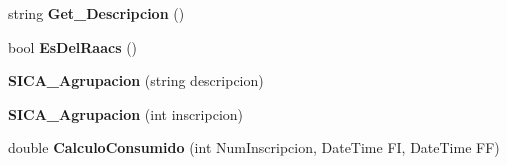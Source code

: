 \begin{DoxyCompactItemize}
\item 
string {\bfseries Get\+\_\+\+Descripcion} ()\hypertarget{class_sica_segura_1_1_s_i_c_a___agrupacion_a41b801855beb2a7ff465c12237178a0e}{}\label{class_sica_segura_1_1_s_i_c_a___agrupacion_a41b801855beb2a7ff465c12237178a0e}

\item 
bool {\bfseries Es\+Del\+Raacs} ()\hypertarget{class_sica_segura_1_1_s_i_c_a___agrupacion_a6d128a60e0dbd6fed779692affa45b9d}{}\label{class_sica_segura_1_1_s_i_c_a___agrupacion_a6d128a60e0dbd6fed779692affa45b9d}

\item 
{\bfseries S\+I\+C\+A\+\_\+\+Agrupacion} (string descripcion)\hypertarget{class_sica_segura_1_1_s_i_c_a___agrupacion_acc504dc1ba2c2d32b370108004135e74}{}\label{class_sica_segura_1_1_s_i_c_a___agrupacion_acc504dc1ba2c2d32b370108004135e74}

\item 
{\bfseries S\+I\+C\+A\+\_\+\+Agrupacion} (int inscripcion)\hypertarget{class_sica_segura_1_1_s_i_c_a___agrupacion_ac55227ea875c3e15cb424b8737b34f5f}{}\label{class_sica_segura_1_1_s_i_c_a___agrupacion_ac55227ea875c3e15cb424b8737b34f5f}

\item 
double {\bfseries Calculo\+Consumido} (int Num\+Inscripcion, Date\+Time FI, Date\+Time FF)\hypertarget{class_sica_segura_1_1_s_i_c_a___agrupacion_a10e0445d4669d6ec4fac8f2730defb67}{}\label{class_sica_segura_1_1_s_i_c_a___agrupacion_a10e0445d4669d6ec4fac8f2730defb67}

\end{DoxyCompactItemize}
